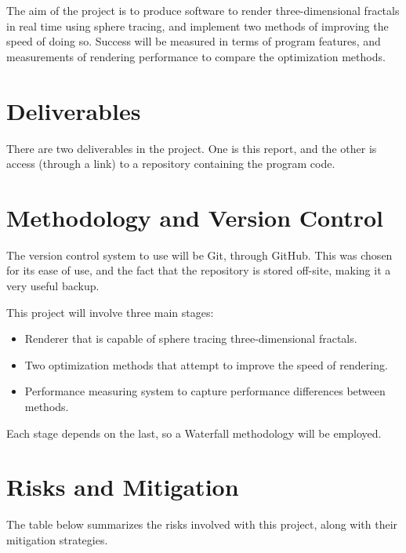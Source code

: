 The aim of the project is to produce software to render three-dimensional fractals in real time using sphere tracing, and implement two methods of improving the speed of doing so. Success will be measured in terms of program features, and measurements of rendering performance to compare the optimization methods.

\section{Deliverables}

There are two deliverables in the project. One is this report, and the other is access (through a link) to a repository containing the program code.

\section{Methodology and Version Control}

The version control system to use will be Git, through GitHub. This was chosen for its ease of use, and the fact that the repository is stored off-site, making it a very useful backup.\newline

This project will involve three main stages:

\begin{itemize}
	\item Renderer that is capable of sphere tracing three-dimensional fractals.
	\item Two optimization methods that attempt to improve the speed of rendering.
	\item Performance measuring system to capture performance differences between methods.
\end{itemize}

Each stage depends on the last, so a Waterfall methodology will be employed.%


\section{Risks and Mitigation}

The table below summarizes the risks involved with this project, along with their mitigation strategies.\newline

